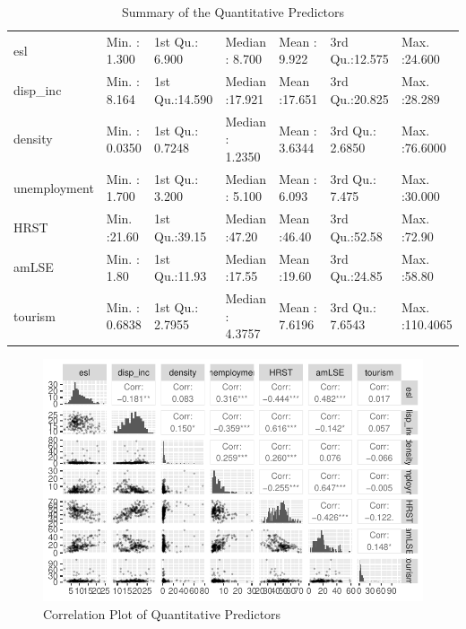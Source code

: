 \documentclass[
  letterpaper,
  DIV=11,
  numbers=noendperiod,
  abstract]{scrartcl}
\begin{document}
\begin{longtable}[]{@{}
  >{\raggedright\arraybackslash}p{}
  >{\raggedright\arraybackslash}p{}
  >{\raggedright\arraybackslash}p{}
  >{\raggedright\arraybackslash}p{}
  >{\raggedright\arraybackslash}p{}
  >{\raggedright\arraybackslash}p{}
  >{\raggedright\arraybackslash}p{}@{}}
\caption{Summary of the Quantitative Predictors}\tabularnewline
\toprule\noalign{}
\endfirsthead
\endhead
\bottomrule\noalign{}
\endlastfoot
esl & Min. : 1.300 & 1st Qu.: 6.900 & Median : 8.700 & Mean : 9.922 &
3rd Qu.:12.575 & Max. :24.600 \\
disp\_inc & Min. : 8.164 & 1st Qu.:14.590 & Median :17.921 & Mean
:17.651 & 3rd Qu.:20.825 & Max. :28.289 \\
density & Min. : 0.0350 & 1st Qu.: 0.7248 & Median : 1.2350 & Mean :
3.6344 & 3rd Qu.: 2.6850 & Max. :76.6000 \\
unemployment & Min. : 1.700 & 1st Qu.: 3.200 & Median : 5.100 & Mean :
6.093 & 3rd Qu.: 7.475 & Max. :30.000 \\
HRST & Min. :21.60 & 1st Qu.:39.15 & Median :47.20 & Mean :46.40 & 3rd
Qu.:52.58 & Max. :72.90 \\
amLSE & Min. : 1.80 & 1st Qu.:11.93 & Median :17.55 & Mean :19.60 & 3rd
Qu.:24.85 & Max. :58.80 \\
tourism & Min. : 0.6838 & 1st Qu.: 2.7955 & Median : 4.3757 & Mean :
7.6196 & 3rd Qu.: 7.6543 & Max. :110.4065 \\
\end{longtable}

\begin{figure}[H]

{\centering \includegraphics[width=1\textwidth,height=\textheight]{report_files/figure-pdf/correlation matrix-1.pdf}

}

\caption{Correlation Plot of Quantitative Predictors}

\end{figure}%
\end{document}
